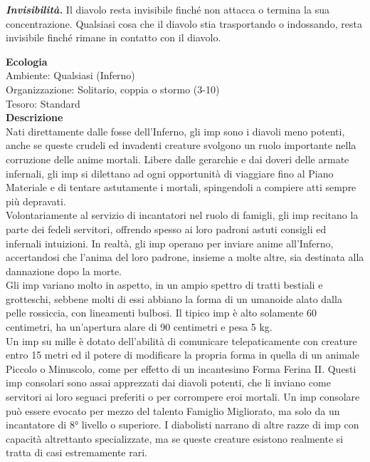 \begin{multicols}{2}
\emph{\textbf{Invisibilità.}} Il diavolo resta invisibile finché non attacca o termina la sua concentrazione. Qualsiasi cosa che il diavolo stia trasportando o indossando, resta invisibile finché rimane in contatto con il diavolo.

\textbf{Ecologia}\\
Ambiente: Qualsiasi (Inferno)\\
Organizzazione: Solitario, coppia o stormo (3-10)\\
Tesoro: Standard\\
\textbf{Descrizione}\\
Nati direttamente dalle fosse dell'Inferno, gli imp sono i diavoli meno potenti, anche se queste crudeli ed invadenti creature svolgono un ruolo importante nella corruzione delle anime mortali. Libere dalle gerarchie e dai doveri delle armate infernali, gli imp si dilettano ad ogni opportunità di viaggiare fino al Piano Materiale e di tentare astutamente i mortali, spingendoli a compiere atti sempre più depravati.\\

Volontariamente al servizio di incantatori nel ruolo di famigli, gli imp recitano la parte dei fedeli servitori, offrendo spesso ai loro padroni astuti consigli ed infernali intuizioni. In realtà, gli imp operano per inviare anime all'Inferno, accertandosi che l'anima del loro padrone, insieme a molte altre, sia destinata alla dannazione dopo la morte.\\

Gli imp variano molto in aspetto, in un ampio spettro di tratti bestiali e grotteschi, sebbene molti di essi abbiano la forma di un umanoide alato dalla pelle rossiccia, con lineamenti bulbosi. Il tipico imp è alto solamente 60 centimetri, ha un'apertura alare di 90 centimetri e pesa 5 kg.\\

Un imp su mille è dotato dell'abilità di comunicare telepaticamente con creature entro 15 metri ed il potere di modificare la propria forma in quella di un animale Piccolo o Minuscolo, come per effetto di un incantesimo Forma Ferina II. Questi imp consolari sono assai apprezzati dai diavoli potenti, che li inviano come servitori ai loro seguaci preferiti o per corrompere eroi mortali. Un imp consolare può essere evocato per mezzo del talento Famiglio Migliorato, ma solo da un incantatore di 8° livello o superiore. I diabolisti narrano di altre razze di imp con capacità altrettanto specializzate, ma se queste creature esistono realmente si tratta di casi estremamente rari.\\


\end{multicols}
